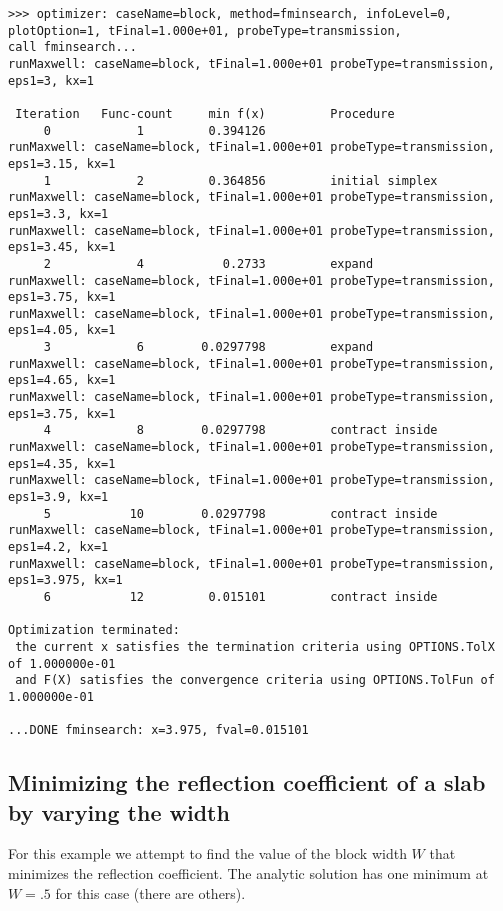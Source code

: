 \documentclass[11pt]{article}
\begin{document}
{\footnotesize
\begin{verbatim}
>>> optimizer: caseName=block, method=fminsearch, infoLevel=0, plotOption=1, tFinal=1.000e+01, probeType=transmission, 
call fminsearch...
runMaxwell: caseName=block, tFinal=1.000e+01 probeType=transmission, eps1=3, kx=1 
 
 Iteration   Func-count     min f(x)         Procedure
     0            1         0.394126         
runMaxwell: caseName=block, tFinal=1.000e+01 probeType=transmission, eps1=3.15, kx=1 
     1            2         0.364856         initial simplex
runMaxwell: caseName=block, tFinal=1.000e+01 probeType=transmission, eps1=3.3, kx=1 
runMaxwell: caseName=block, tFinal=1.000e+01 probeType=transmission, eps1=3.45, kx=1 
     2            4           0.2733         expand
runMaxwell: caseName=block, tFinal=1.000e+01 probeType=transmission, eps1=3.75, kx=1 
runMaxwell: caseName=block, tFinal=1.000e+01 probeType=transmission, eps1=4.05, kx=1 
     3            6        0.0297798         expand
runMaxwell: caseName=block, tFinal=1.000e+01 probeType=transmission, eps1=4.65, kx=1 
runMaxwell: caseName=block, tFinal=1.000e+01 probeType=transmission, eps1=3.75, kx=1 
     4            8        0.0297798         contract inside
runMaxwell: caseName=block, tFinal=1.000e+01 probeType=transmission, eps1=4.35, kx=1 
runMaxwell: caseName=block, tFinal=1.000e+01 probeType=transmission, eps1=3.9, kx=1 
     5           10        0.0297798         contract inside
runMaxwell: caseName=block, tFinal=1.000e+01 probeType=transmission, eps1=4.2, kx=1 
runMaxwell: caseName=block, tFinal=1.000e+01 probeType=transmission, eps1=3.975, kx=1 
     6           12         0.015101         contract inside
 
Optimization terminated:
 the current x satisfies the termination criteria using OPTIONS.TolX of 1.000000e-01 
 and F(X) satisfies the convergence criteria using OPTIONS.TolFun of 1.000000e-01 

...DONE fminsearch: x=3.975, fval=0.015101
\end{verbatim}
}

\subsection{Minimizing the reflection coefficient of a slab by varying the width}

For this example we attempt to find the value of the block width $W$ that  minimizes the reflection coefficient.
The analytic solution has one minimum at $W=.5$ for this case (there are others).
\end{document}
